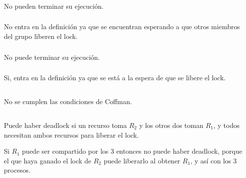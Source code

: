 \subsubsection{}

No pueden terminar su ejecución.

\subsubsection{}

No entra en la definición ya que se encuentran esperando a que otros miembros
del grupo liberen el lock.

\subsubsection{}

No puede terminar su ejecución.

\subsubsection{}

Si, entra en la definición ya que se está a la espera de que se libere el
lock.

\subsection{}

\subsubsection{}

No se cumplen las condiciones de Coffman.

\subsection{}

Puede haber deadlock si un recurso toma $R_2$ y los otros dos toman $R_1$, y
todos necesitan ambos recursos para liberar el lock.

Si $R_1$ puede ser compartido por los 3 entonces no puede haber deadlock,
porque el que haya ganado el lock de $R_2$ puede liberarlo al obtener $R_1$, y
así con los 3 procesos.

\subsection{}

